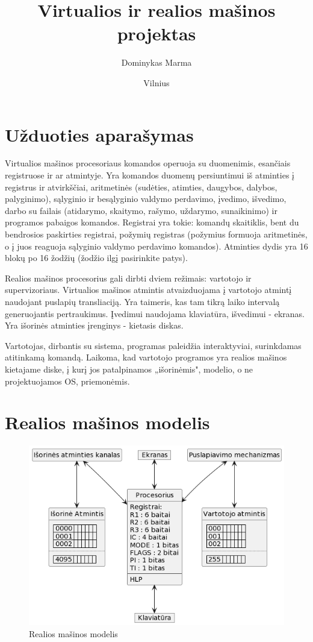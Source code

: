 \documentclass{VUMIFInfKursinis}
\institute{Informatikos institutas}  %
\title{Virtualios ir realios mašinos projektas}
\author{Dominykas Marma}
\date{Vilnius \\ \the\year}
\begin{document}
\maketitle

\tableofcontents

\section{Užduoties aparašymas}

Virtualios mašinos procesoriaus komandos operuoja su duomenimis, esančiais registruose ir ar atmintyje. Yra komandos duomenų persiuntimui iš atminties į registrus ir atvirkščiai, aritmetinės (sudėties, atimties, daugybos, dalybos, palyginimo), sąlyginio ir besąlyginio valdymo perdavimo, įvedimo, išvedimo, darbo su failais (atidarymo, skaitymo, rašymo, uždarymo, sunaikinimo) ir programos pabaigos komandos. Registrai yra tokie: komandų skaitiklis, bent du bendrosios paskirties registrai, požymių registras (požymius formuoja aritmetinės, o į juos reaguoja sąlyginio valdymo perdavimo komandos). Atminties dydis yra 16 blokų po 16 žodžių (žodžio ilgį pasirinkite patys).


Realios mašinos procesorius gali dirbti dviem režimais: vartotojo ir supervizoriaus. Virtualios mašinos atmintis atvaizduojama į vartotojo atmintį naudojant puslapių transliaciją. Yra taimeris, kas tam tikrą laiko intervalą generuojantis pertraukimus. Įvedimui naudojama klaviatūra, išvedimui - ekranas. Yra išorinės atminties įrenginys - kietasis diskas.

Vartotojas, dirbantis su sistema, programas paleidžia interaktyviai, surinkdamas atitinkamą komandą. Laikoma, kad vartotojo programos yra realios mašinos kietajame diske, į kurį jos patalpinamos „išorinėmis", modelio, o ne projektuojamos OS, priemonėmis.

\section{Realios mašinos modelis}

\begin{figure}[H]
	\centering	
	\includegraphics[scale=0.65]{img/reali_masina}
	\caption{Realios mašinos modelis}   %
	\label{img:reali_masina}
\end{figure}
\end{document}
